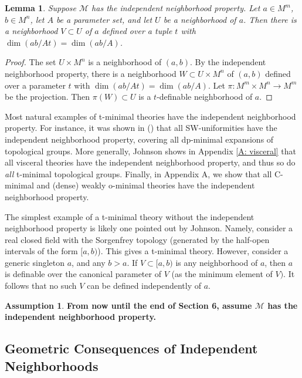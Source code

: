 \documentclass{amsart}
\newtheorem{lemma}[theorem]{Lemma}
\theoremstyle{definition}
\newtheorem{assumption}[theorem]{Assumption}
\begin{document}
\begin{lemma}\label{L: inp for bigger tuple}
    Suppose $\mathcal M$ has the independent neighborhood property. Let $a\in M^m$, $b\in M^n$, let $A$ be a parameter set, and let $U$ be a neighborhood of $a$. Then there is a neighborhood $V\subset U$ of $a$ defined over a tuple $t$ with $\dim(ab/At)=\dim(ab/A)$.
\end{lemma}
\begin{proof}
    The set $U\times M^n$ is a neighborhood of $(a,b)$. By the independent neighborhood property, there is a neighborhood $W\subset U\times M^n$ of $(a,b)$ defined over a parameter $t$ with $\dim(ab/At)=\dim(ab/A)$. Let $\pi:M^m\times M^n\rightarrow M^m$ be the projection. Then $\pi(W)\subset U$ is a $t$-definable neighborhood of $a$.
\end{proof}

Most natural examples of t-minimal theories have the independent neighborhood property. For instance, it was shown in (\cite[Corollary 3.12]{HaHaPeVF}) that all SW-uniformities have the independent neighborhood property,  covering all dp-minimal expansions of topological groups. More generally, Johnson shows in Appendix \ref{A: visceral} that all visceral theories have the independent neighborhood property, and thus so do \textit{all} t-minimal topological groups. Finally, in Appendix A, we show that all C-minimal and (dense) weakly o-minimal theories have the independent neighborhood property.

The simplest example of a t-minimal theory without the independent neighborhood property is likely one pointed out by Johnson. Namely, consider a real closed field with the Sorgenfrey topology (generated by the half-open intervals of the form $[a,b)$). This gives a t-minimal theory. However, consider a generic singleton $a$, and any $b>a$. If $V\subset[a,b)$ is any neighborhood of $a$, then $a$ is definable over the canonical parameter of $V$ (as the minimum element of $V)$. It follows that no such $V$ can be defined independently of $a$. 

\begin{assumption} \textbf{From now until the end of Section 6, assume $\mathcal M$ has the independent neighborhood property.}
\end{assumption}

\subsection{Geometric Consequences of Independent Neighborhoods}
\end{document}
